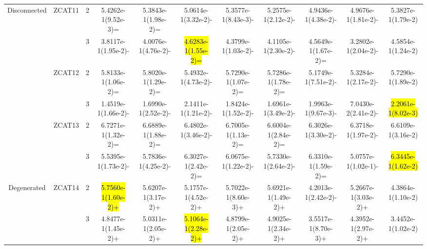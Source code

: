 \documentclass[a4paper,fleqn]{cas-dc}
\newcommand{\highlight}[1]{
	\begingroup
	\sethlcolor{Seashell}%
	\hl{#1}%
	\endgroup
}
\begin{document}
\begin{sloppypar}
\begin{table}[ht]
{\begin{tabular}{ccccccccccc}
					
					
					
					\multirow{6}{*}{Disconnected}&\multirow{2}{*}{ZCAT11}&2&5.4262e-1(9.52e-3)=		&5.3843e-1(1.98e-2)=	&5.0614e-1(3.32e-2)-	&5.3577e-1(8.43e-3)-	&5.2575e-1(2.12e-2)-	&4.9436e-1(4.38e-2)-	&4.9676e-1(1.81e-2)-	&5.3827e-1(1.79e-2)\\
					
					\multirow{6}{*}{~}&\multirow{2}{*}{~}&3	&3.8117e-1(1.95e-2)-		&4.0076e-1(4.76e-2)-	&\highlight{4.6283e-1(1.55e-2)=}	&4.3799e-1(1.03e-2)-	&4.1105e-1(2.30e-2)-	&4.5649e-1(1.67e-2)=	&3.2802e-1(2.04e-2)-	&4.5854e-1(1.24e-2)\\
					
					\multirow{6}{*}{~}&\multirow{2}{*}{ZCAT12}&2	&5.8133e-1(1.06e-2)=		&5.8020e-1(1.29e-2)=	&5.4932e-1(4.73e-2)-	&5.7290e-1(1.07e-2)=	&5.7286e-1(1.78e-2)=	&5.1749e-1(7.51e-2)-	&5.3284e-1(2.17e-2)-	&5.7290e-1(1.89e-2)\\
					
					\multirow{6}{*}{~}&\multirow{2}{*}{~}&3		&1.4519e-1(1.66e-2)-	&1.6990e-1(2.52e-2)-	&2.1411e-1(1.21e-2)-	&1.8424e-1(1.52e-2)-	&1.6961e-1(3.49e-2)-	&1.9963e-1(9.67e-3)-	&7.0430e-2(2.41e-2)-	&\highlight{2.2061e-1(8.02e-3)}\\
					
					
					
					
					
					\multirow{6}{*}{~}&\multirow{2}{*}{ZCAT13}&2	&6.7271e-1(1.32e-2)=	&6.6889e-1(1.88e-2)=	&6.4802e-1(3.46e-2)-	&6.7005e-1(1.13e-2)=	&6.6004e-1(2.84e-2)=	&6.3026e-1(3.30e-2)-	&6.3718e-1(1.97e-2)-	&6.6109e-1(3.16e-2)\\
					
					\multirow{6}{*}{~}&\multirow{2}{*}{~}&3				&5.5395e-1(1.73e-2)-		&5.7836e-1(4.25e-2)-	&6.3027e-1(2.42e-2)=	&6.0675e-1(1.22e-2)-	&5.7330e-1(2.64e-2)-	&6.3310e-1(1.59e-2)=	&5.0757e-1(1.02e-1)-	&\highlight{6.3445e-1(1.62e-2)}\\
					\hline
					
					
					
					
					
					\multirow{2}{*}{Degenerated}&\multirow{2}{*}{ZCAT14}&2&\highlight{5.7560e-1(1.60e-2)+}	&5.6207e-1(3.17e-2)+	&5.1757e-1(4.52e-2)+	&5.7022e-1(8.60e-3)+	&5.6921e-1(1.49e-2)+	&4.2013e-1(2.42e-2)-	&5.2667e-1(3.03e-2)+	&4.3864e-1(1.10e-2)\\
					
					\multirow{2}{*}{~}&\multirow{2}{*}{~}&3&4.8477e-1(1.45e-2)+		&5.0311e-1(2.05e-2)+	&\highlight{5.1064e-1(2.28e-2)+}	&4.8799e-1(2.05e-2)+	&4.9025e-1(2.34e-2)+	&3.5517e-1(8.70e-3)+	&4.3952e-1(2.97e-2)+	&3.4452e-1(1.02e-2)\\
					\hline
					

\end{tabular}}
\end{table}
\end{sloppypar}
\end{document}
